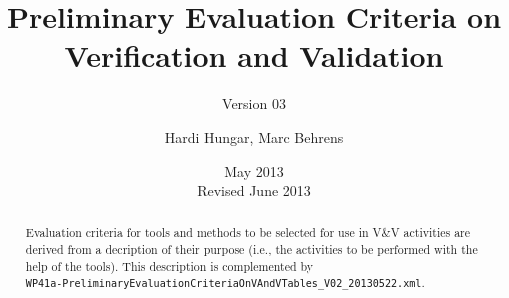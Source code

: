 \documentclass{template/openetcs_article}
\begin{document}
\frontmatter
{}




\title{Preliminary Evaluation Criteria on Verification and Validation}

\subtitle{Version 03}

\date{May 2013\\Revised June 2013}


\author{Hardi Hungar, Marc Behrens}






\begin{abstract}
  \lipsum[12-13]
   Evaluation criteria for tools and methods to be selected for use in
  V\&V activities are derived from a decription of their purpose
  (i.e., the activities to be performed with the help of the
  tools). This description is complemented by\\
    \texttt{WP41a-PreliminaryEvaluationCriteriaOnVAndVTables\_V02\_20130522.xml}. 
\end{abstract}

\maketitle
\tableofcontents
\listoffiguresandtables
\newpage



\end{document}
